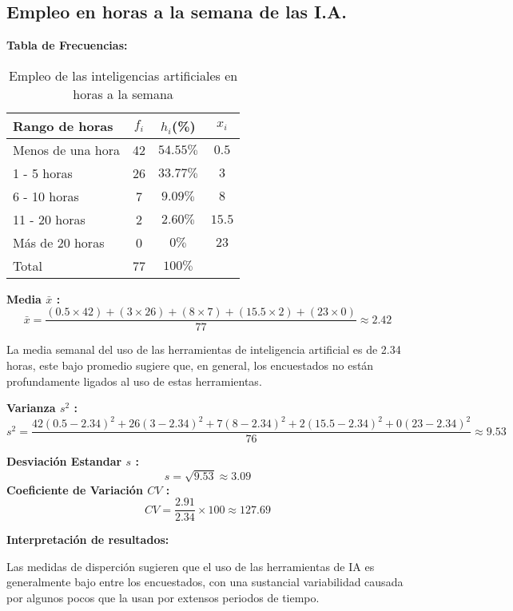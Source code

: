 \subsection{Empleo en horas a la semana de las I.A.}
\textbf{Tabla de Frecuencias:} \\

\begin{table}[h!]
	\centering
	\renewcommand{\arraystretch}{1.5} 
	\begin{tabular}{l c c c }
		\hline
		{Rango de horas} & {\(f_i\)} & \textit{\(h_i\)}(\%) & \textit{\(x_i\)}\\
		\hline
		Menos de una hora	& 42 & \(54.55\%\) & \(0.5\)	\\
		1 - 5 horas			& 26 & \(33.77\%\) & \(3\)		\\
		6 - 10 horas 		& 7  & \(9.09\%\)  & \(8\)		\\
		11 - 20 horas 		& 2  & \(2.60\%\)  & \(15.5\)	\\
		Más de 20 horas		& 0  & \(0\%\)     & \(23\)		\\
		\hline
		Total				& 77 & \(100\%\) \\
		\hline
	\end{tabular}
	\caption{Empleo de las inteligencias artificiales en horas a la semana}
	\label{tabla:EmpleoEnHoras}
\end{table}

\textbf{Media $\bar{x}$ :}
\begin{equation*}
	\bar{x} = \frac{(0.5 \times 42) + (3 \times 26) + (8 \times 7) + (15.5 \times 2) + (23 \times 0)}{77} \approx 2.42
\end{equation*}

La media semanal del uso de las herramientas de inteligencia artificial es de 2.34 horas, este bajo promedio sugiere que, en general, los encuestados no están profundamente ligados al uso de estas herramientas.

\textbf{Varianza $s^2$ :}
\begin{equation*}
	s^2 = \frac{42(0.5 - 2.34)^2 + 26(3 - 2.34)^2 + 7(8 - 2.34)^2 + 2(15.5 - 2.34)^2 + 0(23 - 2.34)^2}{76} \approx 9.53
\end{equation*}

\begin{multicols}{2}
	\textbf{Desviación Estandar $s$ :}
	\begin{equation*}
		s = \sqrt{9.53} \approx 3.09
	\end{equation*}
	\textbf{Coeficiente de Variación $CV$ :}
	\begin{equation*}
		CV = \frac{2.91}{2.34} \times 100 \approx 127.69
	\end{equation*}  
\end{multicols}

\textbf{Interpretación de resultados:}

Las medidas de disperción sugieren que el uso de las herramientas de IA es generalmente bajo entre los encuestados, con una sustancial variabilidad causada por algunos pocos que la usan por extensos periodos de tiempo.